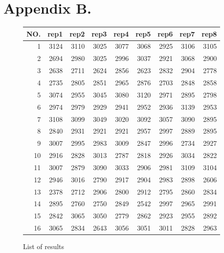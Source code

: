 \chapter{Appendix B.}

\begin{figure}[ht]
	\label{table:appendix:hyperparameter_tuning:final_taguchi}
	\centering
	\begin{tabular}{ rrrrrrrrr }
		\hline
		NO.& rep1 & rep2 & rep3 & rep4 & rep5 & rep6 & rep7 & rep8\\
		\hline
		1 & 3124 & 3110 & 3025 & 3077 & 3068 & 2925 & 3106 & 3105 \\ 
		2 & 2694 & 2980 & 3025 & 2996 & 3037 & 2921 & 3068 & 2900 \\ 
		3 & 2638 & 2711 & 2624 & 2856 & 2623 & 2832 & 2904 & 2778 \\ 
		4 & 2735 & 2805 & 2851 & 2965 & 2876 & 2703 & 2848 & 2858 \\ 
		5 & 3074 & 2955 & 3045 & 3080 & 3120 & 2971 & 2895 & 2798 \\ 
		6 & 2974 & 2979 & 2929 & 2941 & 2952 & 2936 & 3139 & 2953 \\ 
		7 & 3108 & 3099 & 3049 & 3020 & 3092 & 3057 & 3090 & 2895 \\ 
		8 & 2840 & 2931 & 2921 & 2921 & 2957 & 2997 & 2889 & 2895 \\ 
		9 & 3007 & 2995 & 2983 & 3009 & 2847 & 2996 & 2734 & 2927 \\ 
		10 & 2916 & 2828 & 3013 & 2787 & 2818 & 2926 & 3034 & 2822 \\ 
		11 & 3007 & 2879 & 3090 & 3033 & 2906 & 2981 & 3109 & 3104 \\ 
		12 & 2946 & 3016 & 2790 & 2917 & 2904 & 2983 & 2898 & 2606 \\ 
		13 & 2378 & 2712 & 2906 & 2800 & 2912 & 2795 & 2860 & 2834 \\ 
		14 & 2895 & 2760 & 2750 & 2849 & 2542 & 2997 & 2965 & 2991 \\ 
		15 & 2842 & 3065 & 3050 & 2779 & 2862 & 2923 & 2955 & 2892 \\ 
		16 & 3065 & 2834 & 2643 & 3056 & 3051 & 3011 & 2828 & 2963 \\ 
		\hline
	\end{tabular}
	\caption{List of results}

\end{figure}